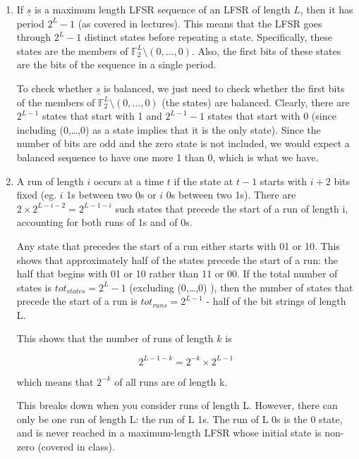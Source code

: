 \usepackage{amsfonts}

\begin{enumerate}

\item If $\underline{s}$ is a maximum length LFSR sequence of an LFSR of length
$L$, then it has period $2^L-1$ (as covered in lectures). This means that the
LFSR goes through $2^L-1$ distinct states before repeating a state.
Specifically, these states are the members of $\mathbb{F}_2^L \setminus
(0,\dots,0)$. Also, the first bits of these states are the bits of the sequence
in a single period.

To check whether $\underline{s}$ is balanced, we just need to check whether the
first bits of the members of $\mathbb{F}_2^L \setminus (0,\dots,0)$ (the states)
are balanced. Clearly, there are $2^{L-1}$ states that start with 1 and
$2^{L-1}-1$ states that start with 0 (since including (0,\dots,0) as a state
implies that it is the only state). Since the number of bits are odd and the
zero state is not included, we would expect a balanced sequence to have one more
1 than 0, which is what we have.

\item A run of length $i$ occurs at a time $t$ if the state at $t-1$ starts with
$i+2$ bits fixed (eg. $i$ 1s between two 0s or $i$ 0s between two 1s). There are
$2 \times 2^{L-i-2} = 2^{L-1-i}$ such states that precede the start of a run of
length i, accounting for both runs of 1s and of 0s.

Any state that precedes the start of a run either starts with 01 or 10. This
shows that approximately half of the states precede the start of a run: the half
that begins with 01 or 10 rather than 11 or 00. If the total number of states is
$tot_{states} = 2^L-1$ (excluding (0,\dots,0) ), then the number of states that
precede the start of a run is $tot_{runs} = 2^{L-1}$ - half of the bit strings
of length L.

This shows that the number of runs of length $k$ is

\[2^{L-1-k} = 2^{-k} \times 2^{L-1}\]

which means that $2^{-k}$ of all runs are of length k.

This breaks down when you consider runs of length L. However, there can only be
one run of length L: the run of L 1s. The run of L 0s is the 0 state, and is
never reached in a maximum-length LFSR whose initial state is non-zero (covered
in class).

\end{enumerate}
